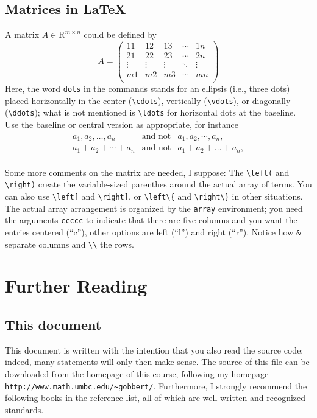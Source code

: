 \documentclass[12pt]{article}
\begin{document}
\subsection{Matrices in \LaTeX}
A matrix $A \in \mathrm{R}^{m \times n}$ could be defined by
\begin{displaymath}
  A = \left( \begin{array}{ccccc}
        11     & 12     & 13     & \cdots & 1n     \\
        21     & 22     & 23     & \cdots & 2n     \\
        \vdots & \vdots & \vdots & \ddots & \vdots \\
        m1     & m2     & m3     & \cdots & mn     \\
      \end{array} \right)
\end{displaymath}
Here, the word \verb+dots+ in the commands stands for an ellipsis
(i.e., three dots) placed horizontally in the center (\verb+\cdots+),
vertically (\verb+\vdots+), or diagonally (\verb+\ddots+); what is
not mentioned is \verb+\ldots+ for horizontal dots at the baseline.
Use the baseline or central version as appropriate, for instance
\begin{eqnarray*}
  a_1, a_2, \ldots, a_n & \mbox{and not} & a_1, a_2, \cdots, a_n, \\
  a_1 + a_2 + \cdots + a_n & \mbox{and not} & a_1 + a_2 + \ldots + a_n, \\
\end{eqnarray*}

Some more comments on the matrix are needed, I suppose:
The \verb+\left(+ and \verb+\right)+ create the variable-sized parenthes
around the actual array of terms. You can also use \verb+\left[+ and
\verb+\right]+, or \verb+\left\{+ and \verb+\right\}+ in other situations.
The actual array arrangement is organized by the \verb+array+ environment;
you need the arguments \verb+ccccc+ to indicate that there are five columns
and you want the entries centered (``c''), other options are left (``l'')
and right (``r''). Notice how \verb+&+ separate columns and \verb+\\+
the rows.

\section{Further Reading}

\subsection{This document}
This document is written with the intention that you also read the source
code; indeed, many statements will only then make sense. The source of
this file can be downloaded from the homepage of this course, following
my homepage \verb+http://www.math.umbc.edu/~gobbert/+.
Furthermore, I strongly recommend the following books in the reference
list, all of which are well-written and recognized standards.
\end{document}
